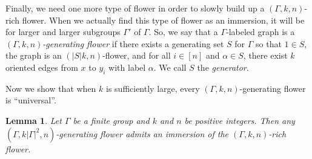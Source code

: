 \documentclass[11pt]{article}
\newtheorem{lemma}[thm]{Lemma}
\theoremstyle{definition}
\begin{document}
Finally, we need one more type of flower in order to slowly build up a $(\Gamma, k, n)$-rich flower. When we actually find this type of flower as an immersion, it will be for larger and larger subgroups $\Gamma'$ of $\Gamma$. So, we say that a $\Gamma$-labeled graph is a \emph{$(\Gamma, k, n)$-generating flower} if there exists a generating set $S$ for $\Gamma$ so that $1 \in S$, the graph is an $(|S|k, n)$-flower, and for all $i \in [n]$ and $\alpha \in S$, there exist $k$ oriented edges from $x$ to $y_i$ with label $\alpha$. We call $S$ the \emph{generator}. 

Now we show that when $k$ is sufficiently large, every $(\Gamma, k, n)$-generating flower is ``universal''.

\begin{lemma}
\label{lem:genFlowUniversal}
    Let $\Gamma$ be a finite group and $k$ and $n$ be positive integers. Then any $(\Gamma, k|\Gamma|^2, n)$-generating flower admits an immersion of the $(\Gamma, k, n)$-rich flower.
\end{lemma}
\end{document}
